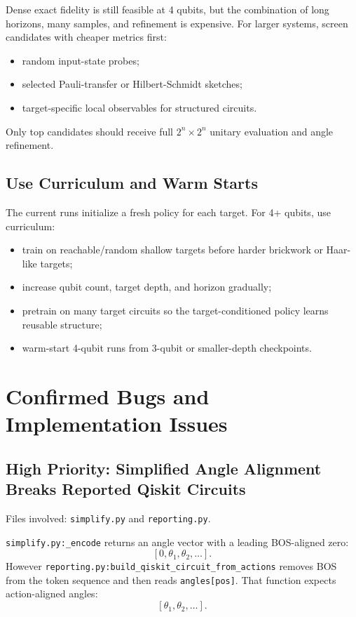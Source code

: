 \documentclass[11pt]{article}
\begin{document}
Dense exact fidelity is still feasible at 4 qubits, but the combination of long
horizons, many samples, and refinement is expensive.  For larger systems, screen
candidates with cheaper metrics first:

\begin{itemize}[leftmargin=*]
  \item random input-state probes;
  \item selected Pauli-transfer or Hilbert-Schmidt sketches;
  \item target-specific local observables for structured circuits.
\end{itemize}

Only top candidates should receive full \(2^n \times 2^n\) unitary evaluation and
angle refinement.

\subsection{Use Curriculum and Warm Starts}

The current runs initialize a fresh policy for each target.  For 4+ qubits, use
curriculum:

\begin{itemize}[leftmargin=*]
  \item train on reachable/random shallow targets before harder brickwork or
  Haar-like targets;
  \item increase qubit count, target depth, and horizon gradually;
  \item pretrain on many target circuits so the target-conditioned policy learns
  reusable structure;
  \item warm-start 4-qubit runs from 3-qubit or smaller-depth checkpoints.
\end{itemize}

\section{Confirmed Bugs and Implementation Issues}

\subsection{High Priority: Simplified Angle Alignment Breaks Reported Qiskit Circuits}

Files involved: \texttt{simplify.py} and \texttt{reporting.py}.

\texttt{simplify.py:\_encode} returns an angle vector with a leading BOS-aligned
zero:
\[
  [0,\theta_1,\theta_2,\ldots].
\]
However \texttt{reporting.py:build\_qiskit\_circuit\_from\_actions} removes BOS
from the token sequence and then reads \texttt{angles[pos]}.  That function
expects action-aligned angles:
\[
  [\theta_1,\theta_2,\ldots].
\]
\end{document}
